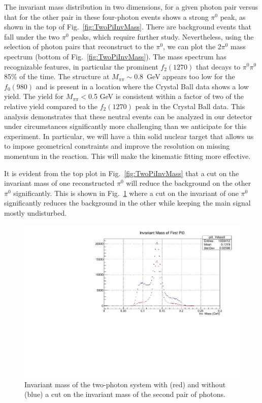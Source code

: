 The invariant mass distribution in two dimensions, for a given photon pair versus that for
the other pair in these four-photon events shows a
strong $\pi^0$ peak, as shown in the top of
Fig.~\ref{fig:TwoPiInvMass}. There are background events that fall
under the two $\pi^0$ peaks, which require further study.
Nevertheless, using the selection of photon pairs that reconstruct to
the $\pi^0$, we can plot the 2$\pi^0$ mass spectrum (bottom of
Fig.~\ref{fig:TwoPiInvMass}). The mass spectrum has recognizable
features, in particular the prominent $f_2(1270)$ that decays to
$\pi^0\pi^0$ 85\% of the time. The structure at $M_{\pi\pi}\sim$0.8~GeV
appears too low for the $f_0(980)$ and is present in a location
where the Crystal Ball data \cite{Marsiske:1990hx} shows a low
yield. The yield for $M_{\pi\pi}<$0.5 GeV is consistent within a
factor of two of the relative yield compared to the $f_2(1270)$ peak in
the Crystal Ball data. This analysis demonstrates that these neutral
events can be analyzed in our detector under circumstances significantly more
challenging than we anticipate for this 
experiment. In particular, we will have
a thin solid nuclear target that allows us to impose geometrical constraints and
improve the resolution on missing momentum in the reaction. This will
make the kinematic fitting more effective.

It is evident from the top plot in Fig.~\ref{fig:TwoPiInvMass} that a cut
on the invariant mass of one reconstructed $\pi^{0}$ will reduce the
background on the other $\pi^{0}$ significantly. This is shown in
Fig.~\ref{fig:pi0yield} where a cut on the invariant of one $\pi^{0}$
significantly reduces the background in the other while keeping the
main signal mostly undisturbed.
\begin{figure}[htp]
\centering\includegraphics[width=4.75in]{figures/pi0_inv_mass_withpi02cut.pdf}
\caption{Invariant mass of the two-photon system with (red) and
  without (blue) a cut on the invariant mass of the second pair of
  photons.
\label{fig:pi0yield}}
\end{figure}

